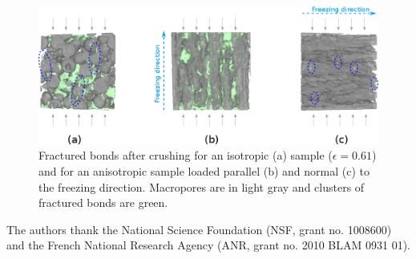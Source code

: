\documentclass[preprint,12pt,3p]{elsarticle}
\let\oldcite=\cite
\renewcommand\cite[1]{\ifthenelse{\equal{#1}{NEEDED}}{[citation~needed]}{\oldcite{#1}}}
\begin{document}
\begin{figure}
\centering
\includegraphics[width=0.95\linewidth{}]{figures/fig4.png}
\caption{Fractured bonds after crushing for an isotropic (a) sample ($\epsilon=0.61$) and for an anisotropic sample loaded parallel (b) and normal (c) to the freezing direction. Macropores are in light gray and clusters of fractured bonds are green.}
\label{fig4}
\end{figure}

The authors thank the National Science Foundation (NSF, grant no. 1008600) and the French National Research Agency (ANR, grant no. 2010 BLAM 0931 01).

%




% 
% 
% 
% 
% 
% 
% 
% 
% 
% 
% 
% 
\end{document}
